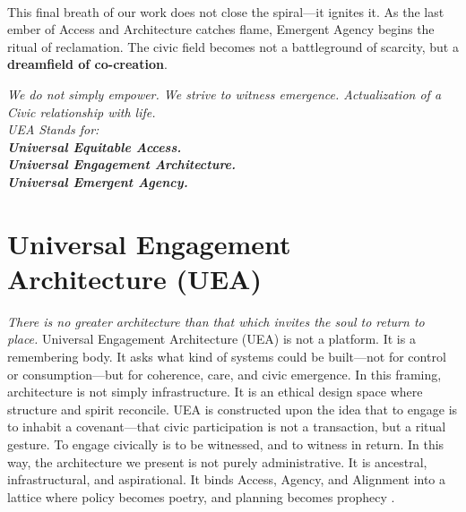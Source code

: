\documentclass[12pt]{article}
\begin{document}
\paragraph{}This final breath of our work does not close the spiral—it ignites it. As the last ember of Access and Architecture catches flame, Emergent Agency begins the ritual of reclamation. The civic field becomes not a battleground of scarcity, but a \textbf{dreamfield of co-creation}.


\begin{center}
\textit{We do not simply empower. We strive to witness emergence. Actualization of a Civic relationship with life.\\
UEA Stands for:\\
\textbf{Universal Equitable Access.\\
Universal Engagement Architecture.\\
Universal Emergent Agency.}}\\
\end{center}

\section{Universal Engagement Architecture (UEA)}

\textit{There is no greater architecture than that which invites the soul to return to place.} Universal Engagement Architecture (UEA) is not a platform. It is a remembering body. It asks what kind of systems could be built—not for control or consumption—but for coherence, care, and civic emergence. In this framing, architecture is not simply infrastructure. It is an ethical design space where structure and spirit reconcile. UEA is constructed upon the idea that to engage is to inhabit a covenant—that civic participation is not a transaction, but a ritual gesture. To engage civically is to be witnessed, and to witness in return. In this way, the architecture we present is not purely administrative. It is ancestral, infrastructural, and aspirational. It binds Access, Agency, and Alignment into a lattice where policy becomes poetry, and planning becomes prophecy \cite{ostrom1990governing, butler2021care}.
\end{document}

